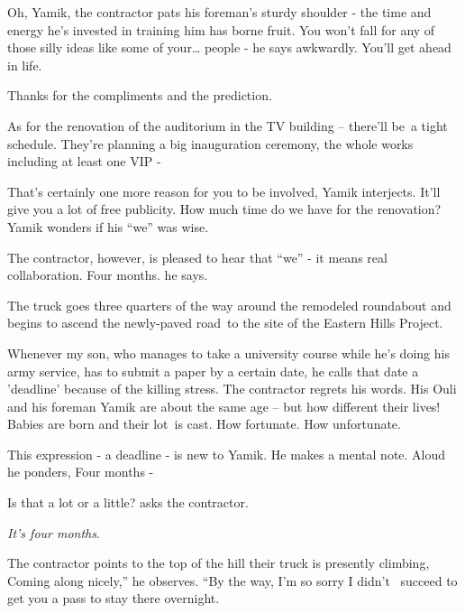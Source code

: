 \documentclass[letterpaper]{article}
\begin{document}
{\textquotedbl}Oh, Yamik,{\textquotedbl} the contractor pats his foreman's sturdy shoulder - the time and energy he's
invested in training him has borne fruit. {\textquotedbl}You won't fall for any of those silly ideas like some of
your{\dots} people -{\textquotedbl} he says awkwardly. {\textquotedbl}You'll get ahead in life.{\textquotedbl} 

{\textquotedbl}Thanks for the compliments and the prediction.{\textquotedbl} 

{\textquotedbl}As for the renovation of the auditorium in the TV building -- there'll be~a tight schedule. They're
planning a big inauguration ceremony, the whole works including at least one VIP -{\textquotedbl} 

{\textquotedbl}That's certainly one more reason for you to be involved,{\textquotedbl} Yamik interjects.
{\textquotedbl}It'll give you a lot of free publicity. How much time do we have for the renovation?{\textquotedbl}
Yamik wonders if his ``we'' was wise.

The contractor, however, is pleased to hear that ``we'' - it means real collaboration. {\textquotedbl}Four
months.{\textquotedbl} he says.

The truck goes three quarters of the way around the remodeled roundabout and begins to ascend the newly-paved road~to
the site of the Eastern Hills Project. 

{\textquotedbl}Whenever my son, who manages{ }to take a university course while he's doing his army
service, has to submit a paper by a certain date, he calls that date a 'deadline' because of the killing
stress.{\textquotedbl} The contractor regrets his words. His Ouli and his foreman Yamik are about the same age -- but
how different their lives! Babies are born and their lot~is cast. How fortunate. How unfortunate.

This expression - {\textquotedbl}a deadline{\textquotedbl} - is new to Yamik. He makes a mental note. Aloud he ponders,
{\textquotedbl}Four months -{\textquotedbl}

{\textquotedbl}Is that a lot or a little?{\textquotedbl} asks the contractor. 

{\textquotedbl}\textit{It's four months}.{\textquotedbl} 

The contractor points to the top of the hill their truck is presently climbing, {\textquotedbl}Coming along nicely,'' he
observes. ``By the way, I'm so sorry I didn't \ succeed to get you a pass to stay there overnight.{\textquotedbl} 
\end{document}
